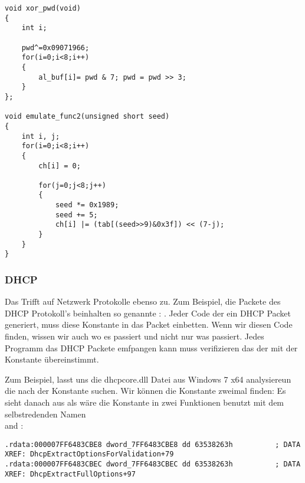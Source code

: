 \begin{lstlisting}[style=customc]
void xor_pwd(void) 
{ 
	int i; 
	
	pwd^=0x09071966;
	for(i=0;i<8;i++) 
	{ 
		al_buf[i]= pwd & 7; pwd = pwd >> 3; 
	} 
};

void emulate_func2(unsigned short seed)
{ 
	int i, j; 
	for(i=0;i<8;i++) 
	{ 
		ch[i] = 0; 
		
		for(j=0;j<8;j++)
		{ 
			seed *= 0x1989; 
			seed += 5; 
			ch[i] |= (tab[(seed>>9)&0x3f]) << (7-j); 
		}
	} 
}
\end{lstlisting}

\subsubsection{DHCP}

Das Trifft auf Netzwerk Protokolle ebenso zu. 
Zum Beispiel, die Packete des DHCP Protokoll's beinhalten so genannte : .
Jeder Code der ein DHCP Packet generiert, muss diese Konstante in das Packet einbetten.
Wenn wir diesen Code finden, wissen wir auch wo es passiert und nicht nur was passiert.
Jedes Programm das DHCP Packete emfpangen kann muss verifizieren das der  mit der Konstante 
übereinstimmt. 


Zum Beispiel, lasst uns die dhcpcore.dll Datei aus Windows 7 x64 analysiereun die nach der Konstante suchen.
Wir können die Konstante zweimal finden:
Es sieht danach aus als wäre die Konstante in zwei Funktionen benutzt mit dem selbstredenden Namen\\
 and :


\begin{lstlisting}[caption=dhcpcore.dll (Windows 7 x64),style=customasmx86]
.rdata:000007FF6483CBE8 dword_7FF6483CBE8 dd 63538263h          ; DATA XREF: DhcpExtractOptionsForValidation+79
.rdata:000007FF6483CBEC dword_7FF6483CBEC dd 63538263h          ; DATA XREF: DhcpExtractFullOptions+97
\end{lstlisting}

